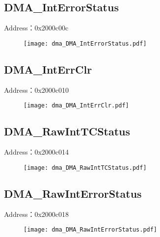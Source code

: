 \subsection{DMA\_IntErrorStatus}
\label{dma-DMA-IntErrorStatus}
Address：0x2000c00c
 \begin{figure}[H]
\texttt{[image: dma\_DMA\_IntErrorStatus.pdf]}
\end{figure}

\subsection{DMA\_IntErrClr}
\label{dma-DMA-IntErrClr}
Address：0x2000c010
 \begin{figure}[H]
\texttt{[image: dma\_DMA\_IntErrClr.pdf]}
\end{figure}

\subsection{DMA\_RawIntTCStatus}
\label{dma-DMA-RawIntTCStatus}
Address：0x2000c014
 \begin{figure}[H]
\texttt{[image: dma\_DMA\_RawIntTCStatus.pdf]}
\end{figure}

\subsection{DMA\_RawIntErrorStatus}
\label{dma-DMA-RawIntErrorStatus}
Address：0x2000c018
 \begin{figure}[H]
\texttt{[image: dma\_DMA\_RawIntErrorStatus.pdf]}
\end{figure}

